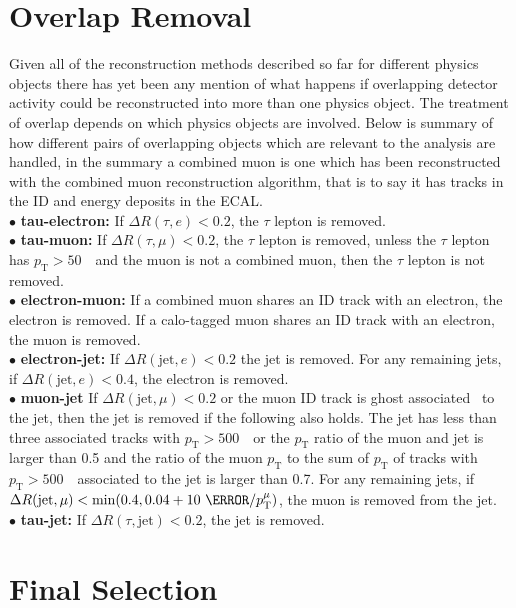 \section{Overlap Removal}
Given all of the reconstruction methods described so far for different physics
objects there has yet been any mention of what happens if overlapping detector
activity could be reconstructed into more than one physics object. The treatment
of overlap depends on which physics objects are involved. Below is summary of
how different pairs of overlapping objects which are relevant to the analysis
are handled, in the summary a combined muon is one which has been reconstructed
with the combined muon reconstruction algorithm, that is to say it has tracks in
the ID and energy deposits in the ECAL.\\
$\bullet$ \textbf{tau-electron:} If $\Delta R(\tau,e)<0.2$, the $\tau$ lepton is
removed.\\
%
$\bullet$ \textbf{tau-muon:} If $\Delta R(\tau,\mu)<0.2$, the $\tau$ lepton is
removed, unless the $\tau$ lepton has $p_{\mathrm{T}}>50$~\GeV\ and the muon is not a combined
muon, then the $\tau$ lepton is not removed.\\
%
$\bullet$ \textbf{electron-muon:} If a combined muon shares an ID track with an
electron, the electron is removed. If a calo-tagged muon shares an ID track with
an electron, the muon is removed.\\
%
$\bullet$ \textbf{electron-jet:} If $\Delta R(\text{jet},e)<0.2$ the jet is
removed. For any remaining jets, if $\Delta R(\text{jet},e)<0.4$, the
electron is removed.\\
%
$\bullet$ \textbf{muon-jet} If $\Delta R(\text{jet},\mu)<0.2$ or the muon ID
track is ghost associated~\cite{PER-2012-02, ghost-ac-01, ghost-ac-02} to
the jet, then the jet is removed if the following also holds. The jet has less
than three associated tracks with $p_{\mathrm{T}} > 500$~\MeV\ or the $p_{\mathrm{T}}$ ratio of the muon
and jet is larger than 0.5 and the ratio of the muon $p_{\mathrm{T}}$ to the sum of $p_{\mathrm{T}}$
of tracks with $p_{\mathrm{T}} > 500$~\MeV\ associated to the jet is larger than 0.7. For
any remaining jets, if $\Delta R(\text{jet},\mu)<\min(0.4, 0.04 + 10\ \GeV /
p_{\mathrm{T}}^{\mu})$, the muon is removed from the jet.\\
%
$\bullet$ \textbf{tau-jet:} If $\Delta R(\tau,\text{jet})<0.2$, the jet is
removed.

\section{Final Selection}
\label{sec:selection}

